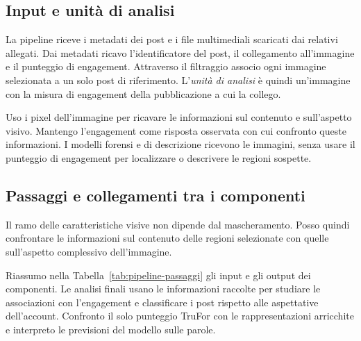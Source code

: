 \subsection{Input e unità di analisi}
\label{subsec:pipeline-input}

La pipeline riceve i metadati dei post e i file multimediali scaricati dai relativi allegati. Dai metadati ricavo l'identificatore del post, il collegamento all'immagine e il punteggio di engagement. Attraverso il filtraggio associo ogni immagine selezionata a un solo post di riferimento. L'\emph{unità di analisi} è quindi un'immagine con la misura di engagement della pubblicazione a cui la collego.

Uso i pixel dell'immagine per ricavare le informazioni sul contenuto e sull'aspetto visivo. Mantengo l'engagement come risposta osservata con cui confronto queste informazioni. I modelli forensi e di descrizione ricevono le immagini, senza usare il punteggio di engagement per localizzare o descrivere le regioni sospette.

\subsection{Passaggi e collegamenti tra i componenti}
\label{subsec:pipeline-passaggi}

Il ramo delle caratteristiche visive non dipende dal mascheramento. Posso quindi confrontare le informazioni sul contenuto delle regioni selezionate con quelle sull'aspetto complessivo dell'immagine.

Riassumo nella Tabella~\ref{tab:pipeline-passaggi} gli input e gli output dei componenti. Le analisi finali usano le informazioni raccolte per studiare le associazioni con l'engagement e classificare i post rispetto alle aspettative dell'account. Confronto il solo punteggio TruFor con le rappresentazioni arricchite e interpreto le previsioni del modello sulle parole.

